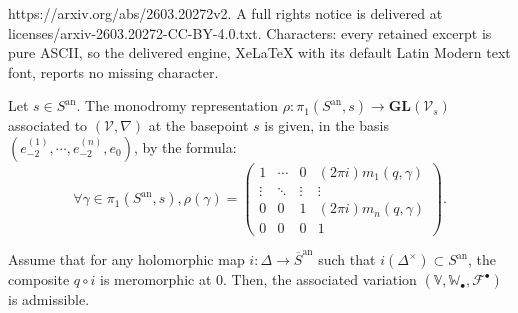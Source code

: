\documentclass[10pt,a4paper]{amsart}
\newcommand{\V}{\mathbb V}
\newcommand{\W}{\mathbb W}
\newcommand{\an}{\mathrm{an}}
\newcommand{\bul}{\bullet}
\newcommand{\gl}{\mathbf{GL}}
\begin{document}
https://arxiv.org/abs/2603.20272v2. A full rights notice is delivered at licenses/arxiv-2603.20272-CC-BY-4.0.txt. Characters: every retained excerpt is pure ASCII, so the delivered engine, XeLaTeX with its default Latin Modern text font, reports no missing character.
\begin{lemma}\label{monoint}
Let $s \in S^\an$. The monodromy representation $\rho : \pi_1(S^\an,s) \rightarrow \gl(\mathcal{V}_s)$ associated to $(\mathcal{V}, \nabla)$ at the basepoint $s$ is given, in the basis $(e_{-2}^{(1)}, \cdots, e_{-2}^{(n)}, e_0)$, by the formula:
\[
\forall \gamma \in \pi_1(S^\an,s), \rho(\gamma) = \left(\begin{array}{cccc}1  &  \cdots & 0 & (2\pi i)m_1(q,\gamma)  \\ \vdots & \ddots & \vdots & \vdots \\0 & 0 & 1 & (2\pi i)m_n(q, \gamma)  \\0 & 0 & 0 & 1\end{array}\right).
\]
\end{lemma}

\begin{proposition}
Assume that for any holomorphic map $i : \Delta \rightarrow \overline{S}^\an$ such that $i(\Delta^\times) \subset S^\an$, the composite $q \circ i$ is meromorphic at $0$. Then, the associated variation $(\V, \W_\bul, \mathcal{F}^\bul)$ is admissible.
\end{proposition}
\end{document}
